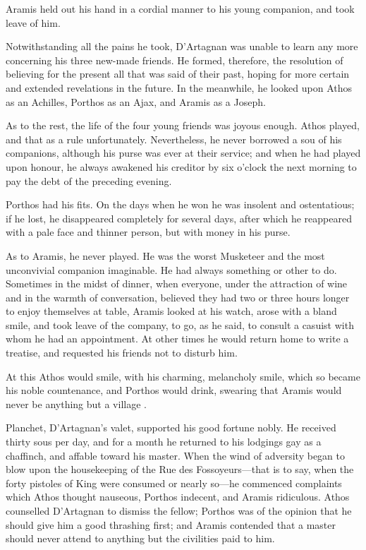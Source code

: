 Aramis held out his hand in a cordial manner to his young companion, and took leave of him. 

Notwithstanding all the pains he took, D'Artagnan was unable to learn any more concerning his three new-made friends. He formed, therefore, the resolution of believing for the present all that was said of their past, hoping for more certain and extended revelations in the future. In the meanwhile, he looked upon Athos as an Achilles, Porthos as an Ajax, and Aramis as a Joseph. 

As to the rest, the life of the four young friends was joyous enough. Athos played, and that as a rule unfortunately. Nevertheless, he never borrowed a sou of his companions, although his purse was ever at their service; and when he had played upon honour, he always awakened his creditor by six o'clock the next morning to pay the debt of the preceding evening. 

Porthos had his fits. On the days when he won he was insolent and ostentatious; if he lost, he disappeared completely for several days, after which he reappeared with a pale face and thinner person, but with money in his purse. 

As to Aramis, he never played. He was the worst Musketeer and the most unconvivial companion imaginable. He had always something or other to do. Sometimes in the midst of dinner, when everyone, under the attraction of wine and in the warmth of conversation, believed they had two or three hours longer to enjoy themselves at table, Aramis looked at his watch, arose with a bland smile, and took leave of the company, to go, as he said, to consult a casuist with whom he had an appointment. At other times he would return home to write a treatise, and requested his friends not to disturb him. 

At this Athos would smile, with his charming, melancholy smile, which so became his noble countenance, and Porthos would drink, swearing that Aramis would never be anything but a village . 

Planchet, D'Artagnan's valet, supported his good fortune nobly. He received thirty sous per day, and for a month he returned to his lodgings gay as a chaffinch, and affable toward his master. When the wind of adversity began to blow upon the housekeeping of the Rue des Fossoyeurs—that is to say, when the forty pistoles of King  were consumed or nearly so—he commenced complaints which Athos thought nauseous, Porthos indecent, and Aramis ridiculous. Athos counselled D'Artagnan to dismiss the fellow; Porthos was of the opinion that he should give him a good thrashing first; and Aramis contended that a master should never attend to anything but the civilities paid to him. 

